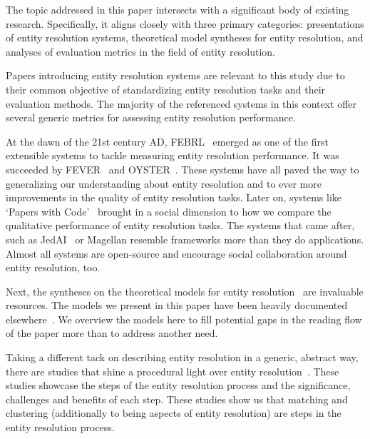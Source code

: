 \documentclass[journal]{IEEEtran}
\begin{document}
    The topic addressed in this paper intersects with a significant body of
    existing research.
    Specifically, it aligns closely with three primary categories: presentations
    of entity resolution systems, theoretical model syntheses for entity
    resolution, and analyses of evaluation metrics in the field of entity
    resolution.

    Papers introducing entity resolution systems are relevant to this study due
    to their common objective of standardizing entity resolution tasks and their
    evaluation methods.
    The majority of the referenced systems in this context offer several generic
    metrics for assessing entity resolution performance.

    At the dawn of the 21st century AD, FEBRL~\cite{febrl2002} emerged as one of
    the first extensible systems to tackle measuring entity resolution
    performance.
    It was succeeded by FEVER~\cite{fever2009} and OYSTER~\cite{oyster2012}.
    These systems have all paved the way to generalizing our understanding about
    entity resolution and to ever more improvements in the quality of entity
    resolution tasks.
    Later on, systems like `Papers with Code'~\cite{papwithcode2019} brought in
    a social dimension to how we compare the qualitative performance of entity
    resolution tasks.
    The systems that came after, such as JedAI~\cite{jedai2017} or Magellan
    \cite{magellan2020} resemble frameworks more than they do
    applications.
    Almost all systems are open-source and encourage social collaboration around
    entity resolution, too.
    
    Next, the syntheses on the theoretical models for entity
    resolution~\cite{fs1969,Ben2009Swoosh,Tal11} are invaluable resources.
    The models we present in this paper have been heavily documented
    elsewhere~\cite{Tal11,tal2013}.    
    We overview the models here to fill potential gaps in the reading flow of
    the paper more than to address another need.
    
    Taking a different tack on describing entity resolution in a generic,
    abstract way, there are studies that shine a procedural light over entity
    resolution~\cite{Pap19,Chen09}.
    These studies showcase the steps of the entity resolution process and the
    significance, challenges and benefits of each step.
    These studies show us that matching and clustering (additionally to being
    aspects of entity resolution) are steps in the entity resolution process.
\end{document}
